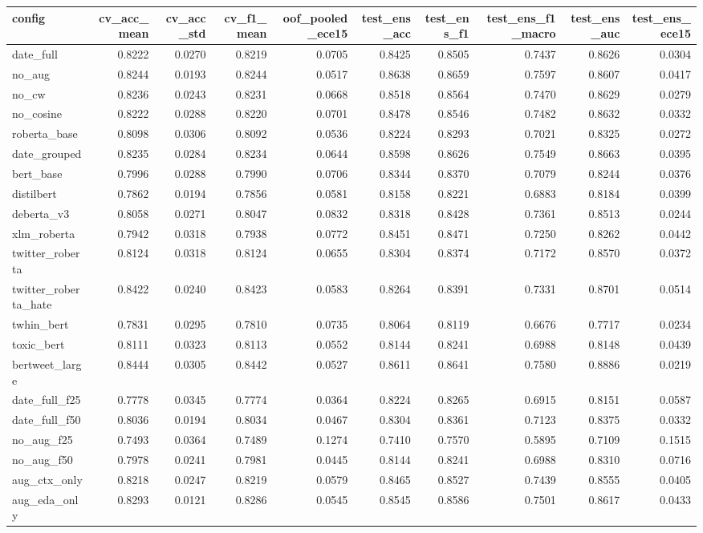 \begin{tabular}{lrrrrrrrrr}
\toprule
config & cv_acc_mean & cv_acc_std & cv_f1_mean & oof_pooled_ece15 & test_ens_acc & test_ens_f1 & test_ens_f1_macro & test_ens_auc & test_ens_ece15 \\
\midrule
date_full & 0.8222 & 0.0270 & 0.8219 & 0.0705 & 0.8425 & 0.8505 & 0.7437 & 0.8626 & 0.0304 \\
no_aug & 0.8244 & 0.0193 & 0.8244 & 0.0517 & 0.8638 & 0.8659 & 0.7597 & 0.8607 & 0.0417 \\
no_cw & 0.8236 & 0.0243 & 0.8231 & 0.0668 & 0.8518 & 0.8564 & 0.7470 & 0.8629 & 0.0279 \\
no_cosine & 0.8222 & 0.0288 & 0.8220 & 0.0701 & 0.8478 & 0.8546 & 0.7482 & 0.8632 & 0.0332 \\
roberta_base & 0.8098 & 0.0306 & 0.8092 & 0.0536 & 0.8224 & 0.8293 & 0.7021 & 0.8325 & 0.0272 \\
date_grouped & 0.8235 & 0.0284 & 0.8234 & 0.0644 & 0.8598 & 0.8626 & 0.7549 & 0.8663 & 0.0395 \\
bert_base & 0.7996 & 0.0288 & 0.7990 & 0.0706 & 0.8344 & 0.8370 & 0.7079 & 0.8244 & 0.0376 \\
distilbert & 0.7862 & 0.0194 & 0.7856 & 0.0581 & 0.8158 & 0.8221 & 0.6883 & 0.8184 & 0.0399 \\
deberta_v3 & 0.8058 & 0.0271 & 0.8047 & 0.0832 & 0.8318 & 0.8428 & 0.7361 & 0.8513 & 0.0244 \\
xlm_roberta & 0.7942 & 0.0318 & 0.7938 & 0.0772 & 0.8451 & 0.8471 & 0.7250 & 0.8262 & 0.0442 \\
twitter_roberta & 0.8124 & 0.0318 & 0.8124 & 0.0655 & 0.8304 & 0.8374 & 0.7172 & 0.8570 & 0.0372 \\
twitter_roberta_hate & 0.8422 & 0.0240 & 0.8423 & 0.0583 & 0.8264 & 0.8391 & 0.7331 & 0.8701 & 0.0514 \\
twhin_bert & 0.7831 & 0.0295 & 0.7810 & 0.0735 & 0.8064 & 0.8119 & 0.6676 & 0.7717 & 0.0234 \\
toxic_bert & 0.8111 & 0.0323 & 0.8113 & 0.0552 & 0.8144 & 0.8241 & 0.6988 & 0.8148 & 0.0439 \\
bertweet_large & 0.8444 & 0.0305 & 0.8442 & 0.0527 & 0.8611 & 0.8641 & 0.7580 & 0.8886 & 0.0219 \\
date_full_f25 & 0.7778 & 0.0345 & 0.7774 & 0.0364 & 0.8224 & 0.8265 & 0.6915 & 0.8151 & 0.0587 \\
date_full_f50 & 0.8036 & 0.0194 & 0.8034 & 0.0467 & 0.8304 & 0.8361 & 0.7123 & 0.8375 & 0.0332 \\
no_aug_f25 & 0.7493 & 0.0364 & 0.7489 & 0.1274 & 0.7410 & 0.7570 & 0.5895 & 0.7109 & 0.1515 \\
no_aug_f50 & 0.7978 & 0.0241 & 0.7981 & 0.0445 & 0.8144 & 0.8241 & 0.6988 & 0.8310 & 0.0716 \\
aug_ctx_only & 0.8218 & 0.0247 & 0.8219 & 0.0579 & 0.8465 & 0.8527 & 0.7439 & 0.8555 & 0.0405 \\
aug_eda_only & 0.8293 & 0.0121 & 0.8286 & 0.0545 & 0.8545 & 0.8586 & 0.7501 & 0.8617 & 0.0433 \\
\bottomrule
\end{tabular}
